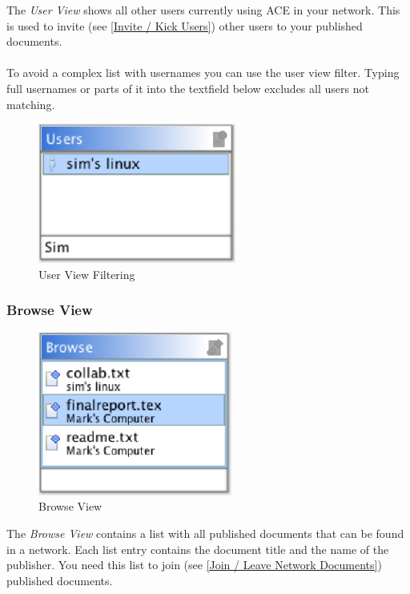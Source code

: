 \documentclass[11pt,a4paper]{article}
\begin{document}
The \textit{User View} shows all other users currently using ACE in your network. This is used to invite (see \ref{Invite / Kick Users}) other users to your published documents. \\
\\
To avoid a complex list with usernames you can use the user view filter. Typing full usernames or parts of it into the textfield below excludes all users not matching.

\begin{figure}[H]
\begin{center}
  \includegraphics[height=1.81in, width=2.56in]{../images/usermanual/uview_filtering.eps}
\caption{User View Filtering}
\label{default}
\end{center}
\end{figure}

\subsubsection{Browse View}

\begin{figure}[H]
\begin{center}
  \includegraphics[height=2.12in, width=2.51in]{../images/usermanual/bview_overview.eps}
\caption{Browse View}
\label{default}
\end{center}
\end{figure}

The \textit{Browse View} contains a list with all published documents that can be found in a network. Each list entry contains the document title and the name of the publisher. You need this list to join (see \ref{Join / Leave Network Documents}) published documents.
\end{document}
